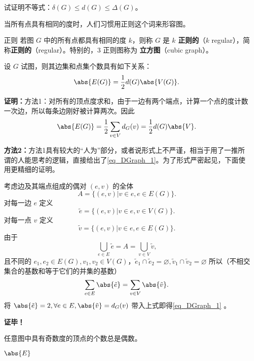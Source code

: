 \begin{exercise}{}
试证明不等式：$\delta(G)\leq d(G)\leq \Delta(G)$。
\end{exercise}


当所有点具有相同的度时，人们习惯用正则这个词来形容图。
\begin{definition}{正则}
若图 $G$ 中的所有点都具有相同的度 $k$，则称 $G$ 是 \textbf{$k$ 正则的}（$k$ regular），简称\textbf{正则的}（regular）。特别的，$3$ 正则图称为 \textbf{立方图}（cubic graph）。
\end{definition}

\begin{theorem}{}
设 $G$ 试图，则其边集和点集个数具有如下关系：
\begin{equation}
\abs{E(G)}=\frac{1}{2}d(G)\abs{V(G)}.~
\end{equation}
\end{theorem}
\textbf{证明：}方法1：对所有的顶点度求和，由于一边有两个端点，计算一个点的度计数一次边，所以每条边刚好被计算两次。因此
\begin{equation}\label{eq_DGraph_1}
\abs{E(G)}=\frac{1}{2}\sum_{v\in V}d_G(v)=\frac{1}{2}d(G)\abs{V}.~
\end{equation}

\textbf{方法2：}方法1具有较大的“人为”部分，或者说形式上不严谨，相当于用了一推所谓的人能思考的逻辑，直接给出了\autoref{eq_DGraph_1}。为了形式严密起见，下面使用更精细的证明。

考虑边及其端点组成的偶对 $(e,v)$ 的全体
\begin{equation}
A=\{(e,v)|v\in e,e\in E(G)\}.~
\end{equation}
对每一边 $e$ 定义
\begin{equation}
\tilde e=\{(e,v)|v\in e,v\in V(G)\}.~
\end{equation}
对每一点 $v$ 定义
\begin{equation}
\tilde v=\{(e,v)|v\in e,e\in E(G)\}.~
\end{equation}
由于 
\begin{equation}
\bigcup_{e\in E}\tilde e=A=\bigcup_{v\in V}\tilde v,~
\end{equation}
且不同的 $e_1,e_2\in E(G),v_1,v_2\in V(G)$，$\tilde e_1\cap\tilde e_2=\varnothing,\tilde v_1\cap\tilde v_2=\varnothing$
所以（不相交集合的基数和等于它们的并集的基数）
\begin{equation}
\sum_{e\in E}\abs{\tilde e}=\sum_{v\in V}\abs{\tilde v}.~
\end{equation}
将 $\abs{\tilde e}=2,\forall e\in E,\abs{\tilde v}=d_G(v)$ 带入上式即得\autoref{eq_DGraph_1} 。

\textbf{证毕！}

\begin{corollary}{}
任意图中具有奇数度的顶点的个数总是偶数。
\end{corollary}
\begin{theorem}{}
 $\abs{E}$
\end{theorem}














